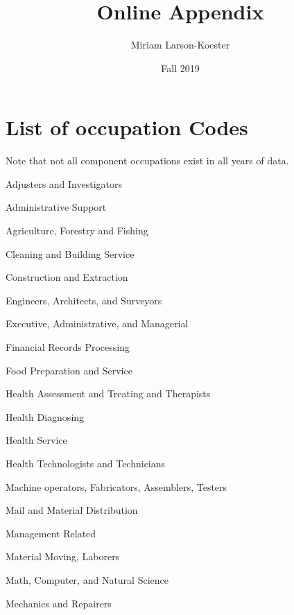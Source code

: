 \documentclass[11pt]{article}
\title{Online Appendix}
\author{Miriam Larson-Koester}
\date{Fall 2019}
\begin{document}
 
\maketitle

\newpage


\section{List of occupation Codes} \label{occupations}

Note that not all component occupations exist in all years of data. 

%

   
   Adjusters and Investigators
   
   Administrative Support
   
   Agriculture, Forestry and Fishing
   
   Cleaning and Building Service 
   
   Construction and Extraction
   
   Engineers, Architects, and Surveyors
   
   Executive, Administrative, and Managerial
   
   Financial Records Processing 
   
   Food Preparation and Service 
   
   Health Assessment and Treating and Therapists
   
   Health Diagnosing
   
   Health Service
   
   Health Technologists and Technicians
   
   Machine operators, Fabricators, Assemblers, Testers
   
   Mail and Material Distribution
   
   Management Related
   
   Material Moving, Laborers
   
   Math, Computer, and Natural Science
   
   Mechanics and Repairers
   
\end{document}
